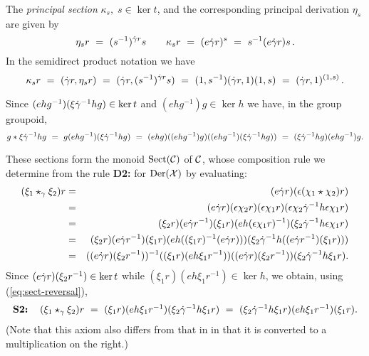 \medskip
The \emph{principal section} $\kappa_s,\; s \in \ker t$, 
  
and the corresponding principal derivation $\eta_s$
are given by
$$
\eta_s r ~=~ (s^{-1})^{\dot{\gamma} r} s \quad\quad
\kappa_s r ~=~ (e \dot{\gamma} r)^s ~=~ s^{-1}(e \dot{\gamma} r)s\,.
$$
In the semidirect product notation we have 
$$
\kappa_s r ~=~ (\dot{\gamma} r,\eta_s r) ~=~ (\dot{\gamma} r,(s^{-1})^{\dot{\gamma} r} s) ~=~
(1,s^{-1})(\dot{\gamma} r,1)(1,s) ~=~ (\dot{\gamma} r,1)^{(1,s)}\,.
$$

\noindent
Since $(ehg^{-1})(\xi \dot{\gamma}^{-1} hg) \in \ker t$ and $(ehg^{-1})g \in \ker h$ 
we have, in the group groupoid, 
\begin{equation} \label{eq:sect-reversal}
g * \xi \dot{\gamma}^{-1} hg ~=~
g(ehg^{-1})(\xi \dot{\gamma}^{-1} hg) ~=~
(ehg)((ehg^{-1})g)((ehg^{-1})(\xi \dot{\gamma}^{-1} hg)) ~=~
(\xi \dot{\gamma}^{-1} hg)(ehg^{-1})g.
\end{equation}

\noindent
These sections form the monoid  $\rm{Sect}(\mathcal{C})$  of  $\mathcal{C}$,
whose composition rule we determine from the rule  
\textbf{D2:}  for  $\mathrm{Der}(\mathcal{X})$  by evaluating:
\begin{eqnarray*}
(\xi_1 \star_{\gamma} \xi_2)r
 & = & (e \dot{\gamma} r)(\epsilon (\chi_1 \star \chi_2) r) \\
 & = & (e \dot{\gamma} r)(\epsilon \chi_2 r)(\epsilon \chi_1 r)
           (\epsilon \chi_2 \dot{\gamma}^{-1} h \epsilon \chi_1 r) \\
 & = & (\xi_2 r)(e \dot{\gamma} r^{-1})(\xi_1 r)(eh(\epsilon \chi_1 r)^{-1})
        (\xi_2 \dot{\gamma}^{-1} h \epsilon \chi_1 r) \\
 & = & (\xi_2 r)(e \dot{\gamma} r^{-1})(\xi_1 r)(eh((\xi_1 r)^{-1}(e \dot{\gamma} r)))
        (\xi_2 \dot{\gamma}^{-1} h ((e \dot{\gamma} r^{-1})(\xi_1 r))) \\
 & = & ((e \dot{\gamma} r)(\xi_2 r^{-1}))^{-1} ((\xi_1 r)(e h \xi_1 r^{-1}))
        ((e \dot{\gamma} r)(\xi_2 r^{-1})) (\xi_2 \dot{\gamma}^{-1} h \xi_1 r).
\end{eqnarray*}
Since  
$(e \dot{\gamma} r)(\xi_2 r^{-1}) \in \ker t$
while  $(\xi_1 r)(e h \xi_1 r^{-1}) \in \ker h$,
we obtain, using (\ref{eq:sect-reversal}),
\begin{equation} \label{eq:section-comp}
\begin{tabular}{l l}
\textbf{S2:}  &  $(\xi_1 \star_{\gamma} \xi_2)r
 ~=~ (\xi_1 r)(e h \xi_1 r^{-1})(\xi_2 \dg^{-1} h \xi_1 r)
 ~=~ (\xi_2 \dg^{-1} h \xi_1 r)(eh \xi_1 r^{-1})(\xi_1 r)$.
\end{tabular}
\end{equation}
(Note that this axiom also differs from that in \cite{alp:wens-ijac}
in that it is converted to a multiplication on the right.) 


